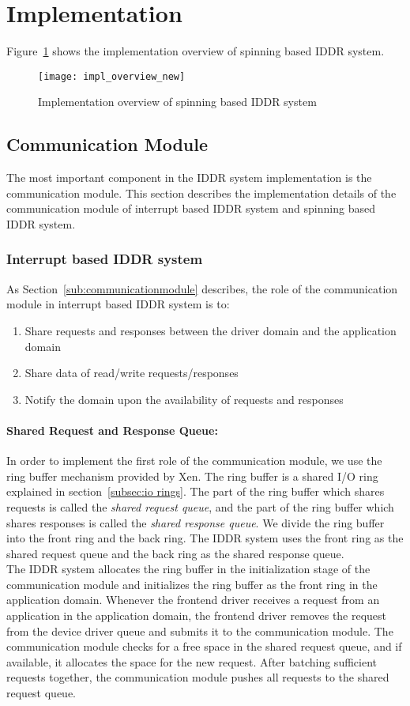 \section{Implementation}

Figure~\ref{fig:Implementation overview} shows the implementation overview of spinning based IDDR system.

\begin{figure}[!ht]
\centering
\texttt{[image: impl\_overview\_new]}
\caption{Implementation overview of spinning based IDDR system}
\label{fig:Implementation overview}
\end{figure}

\subsection{Communication Module}
The most important component in the IDDR system implementation is the communication module. This section describes the implementation details of the communication module of interrupt based IDDR system and spinning based IDDR system. 
\subsubsection*{Interrupt based IDDR system}
As Section~\ref{sub:communicationmodule} describes, the role of the communication module in interrupt based IDDR system is to:
\begin{enumerate} 
\item Share requests and responses between the driver domain and the application domain
\item Share data of read/write requests/responses
\item Notify the domain upon the availability of requests and responses 
\end{enumerate}
\paragraph{Shared Request and Response Queue:}
In order to implement the first role of the communication module, we use the ring buffer mechanism provided by Xen. The ring buffer is a shared I/O ring explained in section~\ref{subsec:io rings}. The part of the ring buffer which shares requests is called the \textit{shared request queue}, and the part of the ring buffer which shares responses is called the \textit{shared response queue}. We divide the ring buffer into the front ring and the back ring. The IDDR system uses the front ring as the shared request queue and the back ring as the shared response queue. 
\\[3mm]
The IDDR system allocates the ring buffer in the initialization stage of the communication module and initializes the ring buffer as the front ring in the application domain. Whenever the frontend driver receives a request from an application in the application domain, the frontend driver removes the request from the device driver queue and submits it to the communication module. The communication module checks for a free space in the shared request queue, and if available, it allocates the space for the new request. After batching sufficient requests together, the communication module pushes all requests to the shared request queue.

